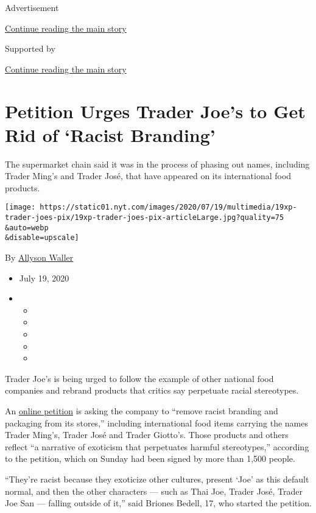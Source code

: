 Advertisement

\protect\hyperlink{after-top}{Continue reading the main story}

Supported by

\protect\hyperlink{after-sponsor}{Continue reading the main story}

\hypertarget{petition-urges-trader-joes-to-get-rid-of-racist-branding}{%
\section{Petition Urges Trader Joe's to Get Rid of `Racist
Branding'}\label{petition-urges-trader-joes-to-get-rid-of-racist-branding}}

The supermarket chain said it was in the process of phasing out names,
including Trader Ming's and Trader José, that have appeared on its
international food products.

\texttt{[image: https://static01.nyt.com/images/2020/07/19/multimedia/19xp-trader-joes-pix/19xp-trader-joes-pix-articleLarge.jpg?quality=75\\\&auto=webp\\\&disable=upscale]}

By \href{https://www.nytimes.com/by/allyson-waller}{Allyson Waller}

\begin{itemize}
\item
  July 19, 2020
\item
  \begin{itemize}
  \item
  \item
  \item
  \item
  \item
  \end{itemize}
\end{itemize}

Trader Joe's is being urged to follow the example of other national food
companies and rebrand products that critics say perpetuate racial
stereotypes.

An
\href{https://www.change.org/p/trader-joe-s-remove-racist-packaging-from-your-products}{online
petition} is asking the company to ``remove racist branding and
packaging from its stores,'' including international food items carrying
the names Trader Ming's, Trader José and Trader Giotto's. Those products
and others reflect ``a narrative of exoticism that perpetuates harmful
stereotypes,'' according to the petition, which on Sunday had been
signed by more than 1,500 people.

``They're racist because they exoticize other cultures, present `Joe' as
this default normal, and then the other characters --- such as Thai Joe,
Trader José, Trader Joe San --- falling outside of it,'' said Briones
Bedell, 17, who started the petition.

